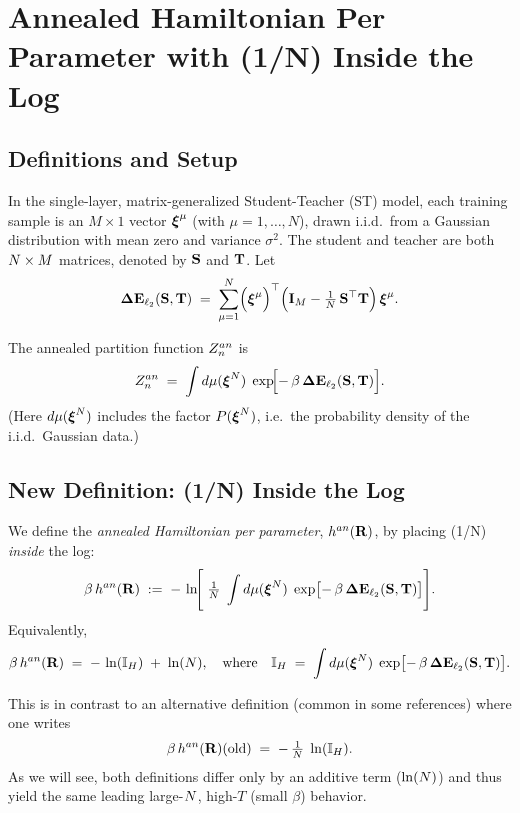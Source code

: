 \documentclass[11pt]{article}
\begin{document}
\section{Annealed Hamiltonian Per Parameter with (1/N) Inside the Log}

\subsection{Definitions and Setup}
In the single-layer, matrix-generalized Student-Teacher (ST) model, each training sample is an \(M \times 1\) vector \(\boldsymbol{\xi}^\mu\) (with \(\mu = 1,\dots,N\)), drawn i.i.d.\ from a Gaussian distribution with mean zero and variance \(\sigma^2\). The student and teacher are both \(N \times M\) matrices, denoted by \({\mathbf{S}}\) and \({\mathbf{T}}\). Let
\begin{equation}
\mathbf{\Delta {E}}_{\ell_2}({\mathbf{S}},{\mathbf{T}}) \;=\; \sum_{\mu=1}^{N} \Bigl(\boldsymbol{\xi}^\mu\Bigr)^{\top}
\Bigl(\mathbf{I}_{M}-\tfrac{1}{N}\,{\mathbf{S}}^{\top}{\mathbf{T}}\Bigr)\,\boldsymbol{\xi}^\mu.
\label{eqn:DeltaE_ST_mat}
\end{equation}

\noindent The annealed partition function \(Z^{an}_{n}\) is
\begin{equation}
Z^{an}_{n} \;=\; \int d\mu(\boldsymbol{\xi}^{N})\;\exp\!\Bigl[-\,\beta\,\mathbf{\Delta {E}}_{\ell_2}({\mathbf{S}},{\mathbf{T}})\Bigr].
\end{equation}
(Here \(d\mu(\boldsymbol{\xi}^{N})\) includes the factor \(P(\boldsymbol{\xi}^{N})\), i.e.\ the probability density of the i.i.d.\ Gaussian data.)

\subsection{New Definition: (1/N) Inside the Log}
We define the \emph{annealed Hamiltonian per parameter}, \(h^{an}(\mathbf{R})\), by placing (1/N) \emph{inside} the log:
\begin{equation}
\beta\,h^{an}(\mathbf{R}) \;:=\;
-\,\ln\!\Biggl[\;\tfrac{1}{N}\;\int d\mu(\boldsymbol{\xi}^{N})\;\exp\bigl[-\,\beta\,\mathbf{\Delta {E}}_{\ell_2}({\mathbf{S}},{\mathbf{T}})\bigr]\Biggr].
\label{eqn:HANpp_newdef}
\end{equation}
Equivalently,
\begin{equation}
\beta\,h^{an}(\mathbf{R}) \;=\; -\,\ln(\mathbb{I}_{H}) \;+\;\ln(N),
\quad
\text{where}
\quad
\mathbb{I}_{H} \;=\;\int d\mu(\boldsymbol{\xi}^{N})\;\exp\bigl[-\,\beta\,\mathbf{\Delta {E}}_{\ell_2}({\mathbf{S}},{\mathbf{T}})\bigr].
\label{eqn:IH_definition}
\end{equation}

\noindent This is in contrast to an alternative definition (common in some references) where one writes
\[
\beta\,h^{an}(\mathbf{R})(\text{old}) \;=\;
-\,\tfrac{1}{N}\;\ln(\mathbb{I}_{H}).
\]
As we will see, both definitions differ only by an additive term (\(\ln(N)\)) and thus yield the same leading large-\(N\), high-\(T\) (small \(\beta\)) behavior.
\end{document}
